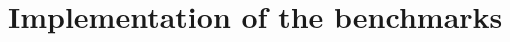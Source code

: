 \chapter{Implementation of the benchmarks}
\label{implementation}
\lstset{frame=none}














